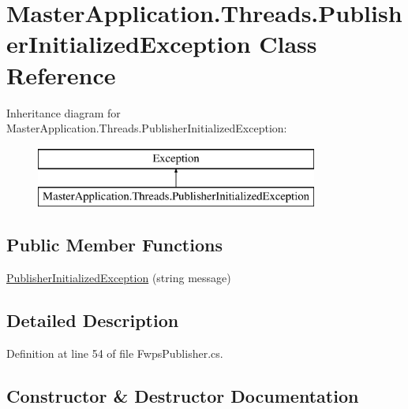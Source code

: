 \hypertarget{class_master_application_1_1_threads_1_1_publisher_initialized_exception}{}\section{Master\+Application.\+Threads.\+Publisher\+Initialized\+Exception Class Reference}
\label{class_master_application_1_1_threads_1_1_publisher_initialized_exception}
Inheritance diagram for Master\+Application.\+Threads.\+Publisher\+Initialized\+Exception\+:\begin{figure}[H]
\begin{center}
\leavevmode
\includegraphics[height=2.000000cm]{class_master_application_1_1_threads_1_1_publisher_initialized_exception}
\end{center}
\end{figure}
\subsection*{Public Member Functions}
\begin{DoxyCompactItemize}
\item 
\mbox{\hyperlink{class_master_application_1_1_threads_1_1_publisher_initialized_exception_acfd139caf388553e1c3320801749dc15}{Publisher\+Initialized\+Exception}} (string message)
\end{DoxyCompactItemize}


\subsection{Detailed Description}


Definition at line 54 of file Fwps\+Publisher.\+cs.



\subsection{Constructor \& Destructor Documentation}
\mbox{\label{class_master_application_1_1_threads_1_1_publisher_initialized_exception_acfd139caf388553e1c3320801749dc15}} 
